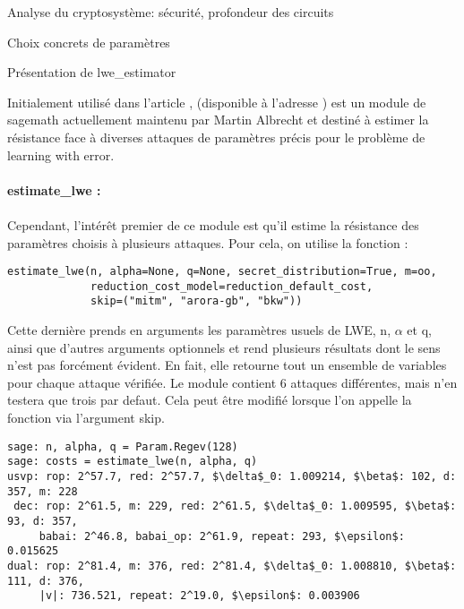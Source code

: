 \begin{section}{Analyse du cryptosystème: sécurité, profondeur des circuits}
	\begin{subsection}{Choix concrets de paramètres}
	\begin{subsubsection}{Présentation de lwe\_estimator}
	
		Initialement utilisé dans l'article
		\cite{EPRINT:AlbPlaSco15},
		(disponible à l'adresse \cite{estimator}) est un module de sagemath actuellement maintenu par
	Martin Albrecht et 
	destiné à estimer la résistance face à diverses attaques de paramètres précis pour
	le problème de learning with error.
	
	
	\paragraph{}
	\textbf{estimate\_lwe :}

	\paragraph{}
	Cependant, l'intérêt premier de ce module est qu'il estime la résistance des paramètres choisis à
	plusieurs attaques. Pour cela, on utilise la fonction  :
	
	\flushleft
	
	\begin{lstlisting}
estimate_lwe(n, alpha=None, q=None, secret_distribution=True, m=oo,
             reduction_cost_model=reduction_default_cost,
             skip=("mitm", "arora-gb", "bkw"))
        \end{lstlisting}
	
	\flushleft
	
	Cette dernière prends en arguments les paramètres usuels de LWE, n, $\alpha$ et q, ainsi que
	d'autres arguments optionnels et rend plusieurs résultats dont le sens n'est pas forcément évident.
	En fait, elle retourne tout un ensemble de variables pour chaque attaque vérifiée. Le module
	contient 6 attaques différentes, mais n'en testera que trois par defaut. Cela peut être modifié
	lorsque l'on appelle la fonction  via l'argument skip.
	
	\flushleft
	
	\begin{lstlisting}[mathescape=true]
sage: n, alpha, q = Param.Regev(128)
sage: costs = estimate_lwe(n, alpha, q)
usvp: rop: 2^57.7, red: 2^57.7, $\delta$_0: 1.009214, $\beta$: 102, d: 357, m: 228
 dec: rop: 2^61.5, m: 229, red: 2^61.5, $\delta$_0: 1.009595, $\beta$: 93, d: 357,
     babai: 2^46.8, babai_op: 2^61.9, repeat: 293, $\epsilon$: 0.015625
dual: rop: 2^81.4, m: 376, red: 2^81.4, $\delta$_0: 1.008810, $\beta$: 111, d: 376,
     |v|: 736.521, repeat: 2^19.0, $\epsilon$: 0.003906
	\end{lstlisting}


\end{subsubsection}
\end{subsection}
\end{section}
